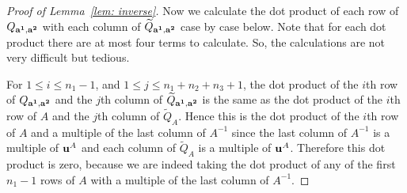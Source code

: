 \documentclass[10pt,a4paper]{amsart}
\begin{document}
\begin{proof} [Proof of Lemma~\ref{lem: inverse}]
Now we calculate the dot product of each row of $Q_{{\bf a^1}, {\bf a^2}}$ with each column of  $\widetilde{Q}_{{\bf a^1}, {\bf a^2}}$ case by case below. Note that for each dot product there are at most four terms to calculate. So, the calculations are not very difficult but tedious. 

For $1 \leq i \leq n_1-1$, and $1 \leq j \leq n_1+n_2+n_3+1$, the dot product of the $i$th row of $Q_{{\bf a^1}, {\bf a^2}}$  and the $j$th  column of $\widetilde{Q}_{{\bf a^1}, {\bf a^2}}$ is the same as the dot product of the $i$th row of $A$ and the  $j$th  column of $\widetilde{Q}_A$. Hence this is the dot product of the $i$th row of $A$ and a multiple of the last column of $A^{-1}$ since the last column of $A^{-1}$ is a multiple of ${\bf u}^A$ and each column of $\widetilde{Q}_A$ is a multiple of ${\bf u}^A$. Therefore this dot product is zero, because we are indeed taking the dot product of any of the first $n_1-1$ rows of $A$ with a multiple of the last column of $A^{-1}$.  


\end{proof}
\end{document}
